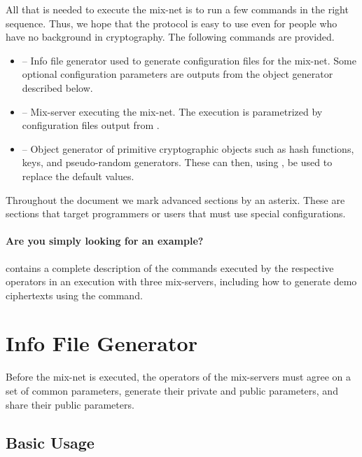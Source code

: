 \documentclass[11pt]{article}
\begin{document}
All that is needed to execute the mix-net is to run a few commands in
the right sequence. Thus, we hope that the protocol is easy to use
even for people who have no background in cryptography. The following
commands are provided.
\begin{itemize}

\item \vmni{} -- Info file generator used to generate configuration
  files for the mix-net. Some optional configuration parameters are
  outputs from the object generator \vog{} described below.

\item \vmn{} -- Mix-server executing the \veri mix-net. The execution
  is parametrized by configuration files output from \vmni{}.

\item \vog{} -- Object generator of primitive cryptographic objects
  such as hash functions, keys, and pseudo-random generators. These
  can then, using \vmni{}, be used to replace the default values.

\end{itemize}
Throughout the document we mark advanced sections by an asterix. These
are sections that target programmers or users that must use special
configurations.


\paragraph{Are you simply looking for an example?} 

 contains a complete description of the commands
executed by the respective operators in an execution with three
mix-servers, including how to generate demo ciphertexts using the
\vmnd{} command.

\section{Info File Generator}\label{sect:infogen}

Before the mix-net is executed, the operators of the mix-servers must
agree on a set of common parameters, generate their private and public
parameters, and share their public parameters.

\subsection{Basic Usage}
\end{document}
